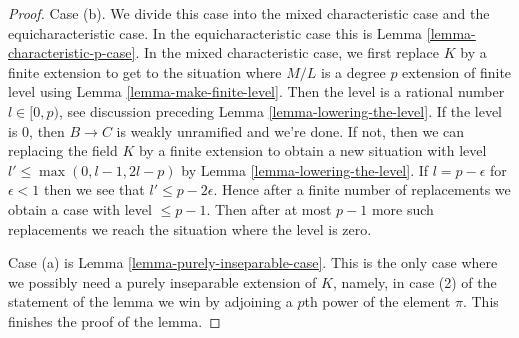 \begin{proof}
\medskip\noindent
Case (b). We divide this case into the mixed characteristic case and the
equicharacteristic case. In the equicharacteristic case this is
Lemma \ref{lemma-characteristic-p-case}. In the mixed characteristic
case, we first replace $K$ by a finite extension to get to the
situation where $M/L$ is a degree $p$ extension of finite level using
Lemma \ref{lemma-make-finite-level}.
Then the level is a rational number $l \in [0, p)$, see discussion
preceding Lemma \ref{lemma-lowering-the-level}. If the level is $0$,
then $B \to C$ is weakly unramified and we're done. If not, then we
can replacing the field $K$ by a finite extension to obtain a new
situation with level $l' \leq \max(0, l - 1, 2l - p)$ by
Lemma \ref{lemma-lowering-the-level}.
If $l = p - \epsilon$ for $\epsilon < 1$ then we see that
$l' \leq p - 2\epsilon$. Hence after a finite number of replacements
we obtain a case with level $\leq p - 1$. Then after at most $p - 1$
more such replacements we reach the situation where the level is zero.

\medskip\noindent
Case (a) is Lemma \ref{lemma-purely-inseparable-case}. This is the only case
where we possibly need a purely inseparable extension of $K$, namely, in
case (2) of the statement of the lemma we win by adjoining a $p$th power
of the element $\pi$. This finishes the proof of the lemma.
\end{proof}
